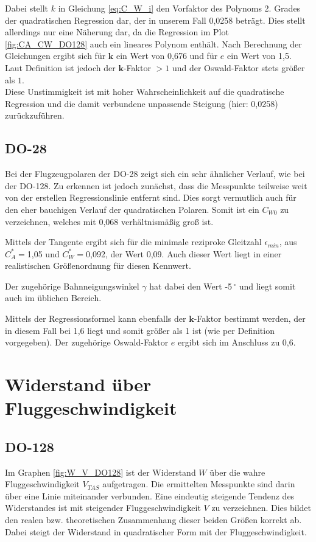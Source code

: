 Dabei stellt $k$ in Gleichung \ref{eq:C_W_i} den Vorfaktor des Polynoms 2. Grades der quadratischen Regression dar, der in unserem Fall 0,0258 beträgt. Dies stellt allerdings nur eine Näherung dar, da die Regression im Plot \ref{fig:CA_CW_DO128} auch ein lineares Polynom enthält. Nach Berechnung der Gleichungen ergibt sich für $\textbf{k}$ ein Wert von 0,676 und für $e$ ein Wert von 1,5. 
Laut Definition ist jedoch der $\textbf{k}$-Faktor $>1$ und der Oswald-Faktor stets größer als $1$. \\
Diese Unstimmigkeit ist mit hoher Wahrscheinlichkeit auf die quadratische Regression und die damit verbundene unpassende Steigung (hier: 0,0258) zurückzuführen.

\subsection{DO-28}

Bei der Flugzeugpolaren der DO-28 zeigt sich ein sehr ähnlicher Verlauf, wie bei der DO-128. Zu erkennen ist jedoch zunächst, dass die Messpunkte teilweise weit von der erstellen Regressionslinie entfernt sind. Dies sorgt vermutlich auch für den eher bauchigen Verlauf der quadratischen Polaren. Somit ist ein $C_{W0}$ zu verzeichnen, welches mit 0,068 verhältnismäßig groß ist. 

Mittels der Tangente ergibt sich für die minimale reziproke Gleitzahl $\epsilon_{min}$, aus $C_A^*=$1,05 und $C_W^*=$0,092, der Wert 0,09. Auch dieser Wert liegt in einer realistischen Größenordnung für diesen Kennwert.

Der zugehörige Bahnneigungswinkel $\gamma$ hat dabei den Wert -5$^{\ \circ}$ und liegt somit auch im üblichen Bereich. 

Mittels der Regressionsformel kann ebenfalls der $\textbf{k}$-Faktor bestimmt werden, der in diesem Fall bei 1,6 liegt und somit größer als 1 ist (wie per Definition vorgegeben). Der zugehörige Oswald-Faktor $e$ ergibt sich im Anschluss zu 0,6. 

\section{Widerstand über Fluggeschwindigkeit}

\subsection{DO-128}

Im Graphen \ref{fig:W_V_DO128} ist der Widerstand $W$ über die wahre Fluggeschwindigkeit $V_{TAS}$ aufgetragen. Die ermittelten Messpunkte sind darin über eine Linie miteinander verbunden. Eine eindeutig steigende Tendenz des Widerstandes ist mit steigender Fluggeschwindigkeit $V$ zu verzeichnen. Dies bildet den realen bzw. theoretischen Zusammenhang dieser beiden Größen korrekt ab. Dabei steigt der Widerstand in quadratischer Form mit der Fluggeschwindigkeit.

